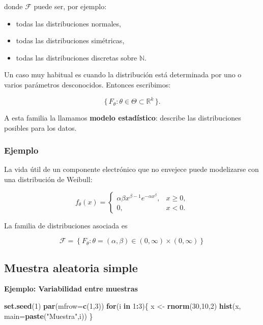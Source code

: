 \documentclass[
]{article}
\newenvironment{Shaded}{\begin{snugshade}}{\end{snugshade}}
\newcommand{\AttributeTok}[1]{\textcolor[rgb]{0.13,0.29,0.53}{#1}}
\newcommand{\ControlFlowTok}[1]{\textcolor[rgb]{0.13,0.29,0.53}{\textbf{#1}}}
\newcommand{\DecValTok}[1]{\textcolor[rgb]{0.00,0.00,0.81}{#1}}
\newcommand{\FunctionTok}[1]{\textcolor[rgb]{0.13,0.29,0.53}{\textbf{#1}}}
\newcommand{\NormalTok}[1]{#1}
\newcommand{\OtherTok}[1]{\textcolor[rgb]{0.56,0.35,0.01}{#1}}
\newcommand{\SpecialCharTok}[1]{\textcolor[rgb]{0.81,0.36,0.00}{\textbf{#1}}}
\newcommand{\StringTok}[1]{\textcolor[rgb]{0.31,0.60,0.02}{#1}}
\providecommand{\tightlist}{%
  \setlength{\itemsep}{0pt}\setlength{\parskip}{0pt}}
\begin{document}
donde \(\mathcal{F}\) puede ser, por ejemplo:

\begin{itemize}
\tightlist
\item
  todas las distribuciones normales,
\item
  todas las distribuciones simétricas,
\item
  todas las distribuciones discretas sobre \(\mathbb{N}\).
\end{itemize}

Un caso muy habitual es cuando la distribución está determinada por uno o varios parámetros desconocidos. Entonces escribimos:

\[
\{\,F_\theta : \theta \in \Theta \subset \mathbb{R}^k \,\}.
\]

A esta familia la llamamos \textbf{modelo estadístico}: describe las distribuciones posibles para los datos.

\subsubsection{Ejemplo}\label{ejemplo-4}

La vida útil de un componente electrónico que no envejece puede modelizarse con una distribución de Weibull:

\[
f_\theta(x) =
\begin{cases}
\alpha \beta x^{\beta-1} e^{-\alpha x^\beta}, & x\ge 0,\\[4pt]
0, & x<0.
\end{cases}
\]

La familia de distribuciones asociada es

\[
\mathcal{F}=\left\{F_{\theta}: \theta=(\alpha, \beta) \in(0, \infty) \times(0, \infty)\right\}
\]

\subsection{Muestra aleatoria simple}\label{muestra-aleatoria-simple}

\textbf{Ejemplo: Variabilidad entre muestras}

\begin{Shaded}
\begin{Highlighting}[]
\FunctionTok{set.seed}\NormalTok{(}\DecValTok{1}\NormalTok{)}
\FunctionTok{par}\NormalTok{(}\AttributeTok{mfrow=}\FunctionTok{c}\NormalTok{(}\DecValTok{1}\NormalTok{,}\DecValTok{3}\NormalTok{))}
\ControlFlowTok{for}\NormalTok{(i }\ControlFlowTok{in} \DecValTok{1}\SpecialCharTok{:}\DecValTok{3}\NormalTok{)\{}
\NormalTok{  x }\OtherTok{\textless{}{-}} \FunctionTok{rnorm}\NormalTok{(}\DecValTok{30}\NormalTok{,}\DecValTok{10}\NormalTok{,}\DecValTok{2}\NormalTok{)}
  \FunctionTok{hist}\NormalTok{(x, }\AttributeTok{main=}\FunctionTok{paste}\NormalTok{(}\StringTok{"Muestra"}\NormalTok{,i))}
\NormalTok{\}}
\end{Highlighting}
\end{Shaded}
\end{document}
